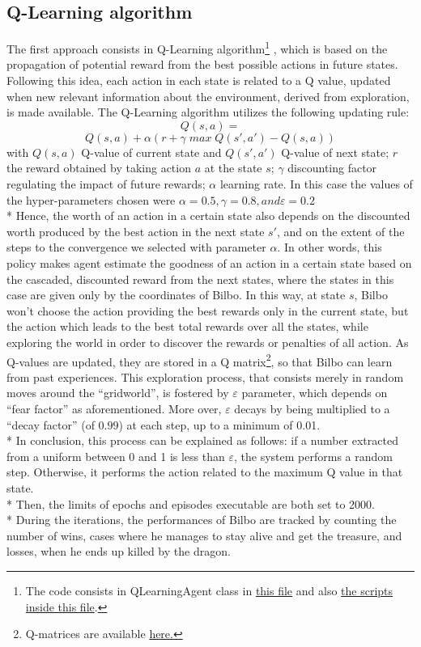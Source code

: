 \subsection{Q-Learning algorithm}
The first approach consists in Q-Learning algorithm\footnote{The code consists in QLearningAgent class in \href{https://github.com/moiraghif/DragonHunting/blob/master/Bilbo\%20World/agents.py}{this file} and also \href{https://github.com/moiraghif/DragonHunting/blob/master/Bilbo\%20World/Bilbo_q_learning.py}{the scripts inside this file}.} \cite{2}, which is based on the propagation of potential reward from the best possible actions in future states. Following this idea, each action in each state is related to a Q value, updated when new relevant information about the environment, derived from exploration, is made available. The Q-Learning algorithm utilizes the following updating rule:
$$Q(s,a)=$$ 
$$Q(s,a)+\alpha(r+\gamma\;max\;Q(s',a') - Q(s,a))$$
with $Q(s,a)$ Q-value of current state and $Q(s',a')$ Q-value of next state; $r$ the reward obtained by taking action $a$ at the state $s$; $\gamma$ discounting factor regulating the impact of future rewards; $\alpha$ learning rate. In this case the values of the hyper-parameters chosen were $\alpha=0.5, \gamma=0.8, and \varepsilon=0.2$\\*
Hence, the worth of an action in a certain state also depends on the discounted worth produced by the best action in the next state $s'$, and on the extent of the steps to the convergence we selected with parameter $\alpha$. In other words, this policy makes agent estimate the goodness of an action in a certain state based on the cascaded, discounted reward from the next states, where the states in this case are given only by the coordinates of Bilbo. 
In this way, at state $s$, Bilbo won't choose the action providing the best rewards only in the current state, but the action which leads to the best total rewards over all the states, while exploring the world in order to discover the rewards or penalties of all action. As Q-values are updated, they are stored in a Q matrix\footnote{Q-matrices are available \href{https://github.com/moiraghif/DragonHunting/tree/master/Bilbo\%20World/models}{here.}}, so that Bilbo can learn from past experiences. This exploration process, that consists merely in random moves around the ``gridworld'', is fostered by $\varepsilon$ parameter, which depends on ``fear factor'' as aforementioned. More over, $\varepsilon$ decays by being multiplied to a ``decay factor'' (of $0.99$) at each step, up to a minimum of 0.01.\\*
In conclusion, this process can be explained as follows: if a number extracted from a uniform between 0 and 1 is less than $\varepsilon$, the system performs a random step. Otherwise, it performs the action related to the maximum Q value in that state.\\* 
Then, the limits of epochs and episodes executable are both set to 2000.\\*
During the iterations, the performances of Bilbo are tracked by counting the number of wins, cases where he manages to stay alive and get the treasure, and losses, when he ends up killed by the dragon.

